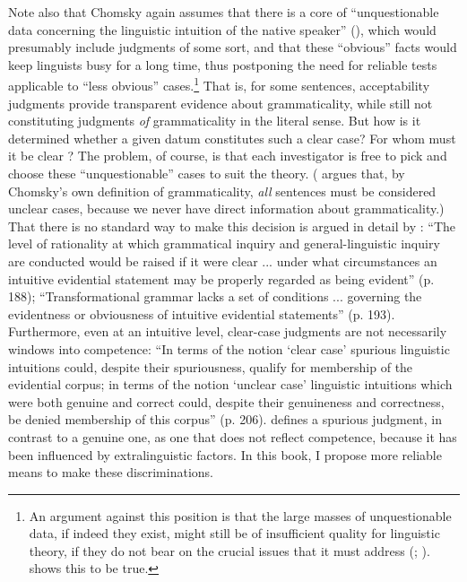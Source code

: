 Note also that Chomsky again assumes that there is a core of ``unquestionable data concerning the linguistic intuition of the native speaker'' (\citet[20]{Aspects}), which would presumably include judgments of some sort, and that these ``obvious'' facts would keep linguists busy for a long time, thus postponing the need for reliable tests applicable to ``less obvious'' cases.\footnote{An argument against this position is that the large masses of unquestionable data, if indeed they exist, might still be of insufficient quality for linguistic theory, if they do not bear on the crucial issues that it must address (\citealt{Botha1973}; \citealt{Labov1972a}).  shows this to be true.}
 That is, for some sentences, acceptability judgments provide transparent evidence about grammaticality, while still not constituting judgments  \textit{of} grammaticality in the literal sense. But how is it determined whether a given datum constitutes such a clear case? For whom must it be clear \citep{Ringen1979}? The problem, of course, is that each investigator is free to pick and choose these ``unquestionable'' cases to suit the theory. (\citet{McCawley1976}
 argues that, by Chomsky's own definition of grammaticality, \textit{all} sentences must be considered unclear cases, because we never have direct information about grammaticality.) That there is no standard way to make this decision is argued in detail by \citet{Botha1973}: ``The level of rationality at which grammatical inquiry and general-linguistic inquiry are conducted would be raised if it were clear ... under what circumstances an intuitive evidential statement may be properly regarded as being evident'' (p. 188); ``Transformational grammar lacks a set of conditions ... governing the evidentness or obviousness of intuitive evidential statements'' (p. 193). Furthermore, even at an intuitive level, clear-case judgments are not necessarily windows into competence: ``In terms of the notion `clear case' spurious linguistic intuitions could, despite their spuriousness, qualify for membership of the evidential corpus; in terms of the notion `unclear case' linguistic intuitions which were both genuine and correct could, despite their genuineness and correctness, be denied membership of this corpus'' (p. 206). \citet{Botha1981} defines a spurious judgment, in contrast to a genuine one, as one that does not reflect competence, because it has been influenced by extralinguistic factors. In this book, I propose more reliable means to make these discriminations.

